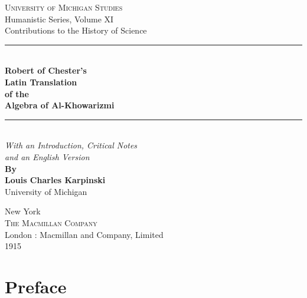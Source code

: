 \documentclass[11pt,a4paper]{book}
\newcommand{\longline}{\noindent\rule{\textwidth}{0.4pt}}
\begin{document}
\frontmatter

\begin{titlepage}
\begin{center}
\vspace*{2cm}

{\Large\textsc{University of Michigan Studies}}\\[0.5cm]
{\large Humanistic Series, Volume XI}\\[0.5cm]
{\normalsize Contributions to the History of Science}\\[1cm]

\longline\\[1.5cm]

{\Huge\bfseries\color{titlecolor} Robert of Chester's\\[0.3cm]
Latin Translation\\[0.3cm]
of the\\[0.5cm]
Algebra of Al-Khowarizmi}\\[1.5cm]

\longline\\[1.5cm]

{\Large\textit{With an Introduction, Critical Notes\\[0.2cm]
and an English Version}}\\[1.5cm]

{\large\textbf{By}}\\[0.3cm]
{\Large\textbf{Louis Charles Karpinski}}\\[0.2cm]
{\normalsize University of Michigan}\\[2cm]

\vfill

{\large New York}\\
{\large\textsc{The Macmillan Company}}\\[0.2cm]
London : Macmillan and Company, Limited\\[0.5cm]
{\large 1915}

\end{center}
\end{titlepage}

\chapter*{Preface}
\end{document}
